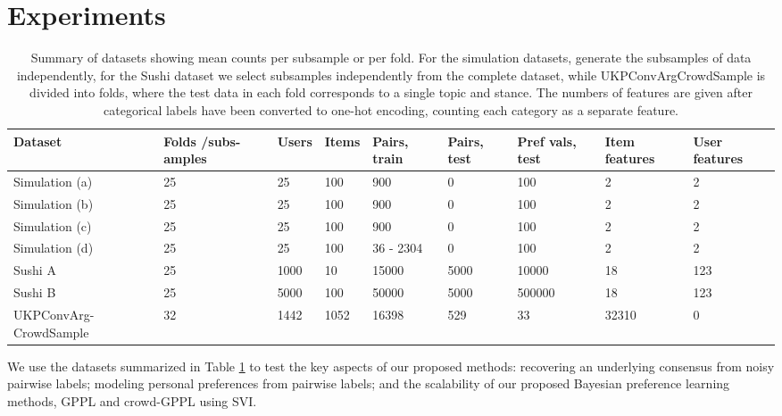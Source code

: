 \section{Experiments}\label{sec:expts}


\begin{table}
\begin{tabularx}{\textwidth}{| p{1.9cm} | X | X | X | X | X | X | X | X |}
\hline
Dataset & Folds /subs-amples & Users & Items & Pairs, train & Pairs, test & Pref vals, test & Item features & User features \\
\hline\hline
Simulation (a) & 25 & 25 & 100 & 900 & 0  & 100 & 2 & 2\\
Simulation (b) & 25 & 25 & 100 & 900 & 0 & 100 & 2 & 2 \\
Simulation (c) & 25 & 25 & 100 & 900 & 0 & 100 & 2 & 2\\
Simulation (d) & 25 & 25 & 100 & 36 - 2304 & 0 & 100 & 2 & 2\\
\hline
Sushi A & 25 & 1000 & 10 & 15000 & 5000 & 10000 & 18 & 123 \\
Sushi B & 25 & 5000 & 100 & 50000 & 5000 & 500000 &  18 & 123 \\
\hline
UKPConvArg-CrowdSample & 32 & 1442 & 1052 & 16398 & 529 & 33 & 32310 & 0
\\ \hline
\end{tabularx}
\caption{Summary of datasets showing mean counts per subsample or per fold. For the simulation datasets, generate the subsamples of data independently, for the Sushi dataset we select subsamples independently from the complete dataset, while  
UKPConvArgCrowdSample is divided into folds, where the test data in each fold corresponds to a single topic and stance. The numbers of features are given after categorical labels have been converted to one-hot encoding, counting
each category as a separate feature.
}
\label{tab:datasets}
\end{table}
We use the datasets summarized in Table \ref{tab:datasets} to test the key aspects of our proposed methods: recovering an underlying consensus from noisy pairwise labels; modeling personal preferences from pairwise labels; and the scalability of our proposed Bayesian preference learning methods, GPPL and crowd-GPPL using SVI.
